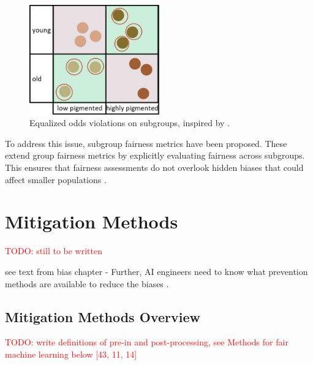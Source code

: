 \documentclass[12pt, a4paper, oneside]{book}   	%
\renewcommand{\todo}[1]{\textcolor{red}{TODO: #1}}
\begin{document}
		\begin{figure}[H]
			\centering
			\includegraphics[width=0.5\textwidth]{figures/EqualizedOddsSubgroupsIssueIllustration.png}
			\caption{Equalized odds violations on subgroups, inspired by \textcite{M80_Kearns_2019}.}
			\label{fig:eqOddsLimits}
		\end{figure}
		
		To address this issue, subgroup fairness metrics have been proposed. These extend group fairness metrics by explicitly evaluating fairness across subgroups. This ensures that fairness assessments do not overlook hidden biases that could affect smaller populations \autocite{M79_Kearns_2018,M80_Kearns_2019}.
		
			
		\section{Mitigation Methods}
			 \todo{still to be written}
			 
			 see text from bias chapter - Further, \gls{AI} engineers need to know what prevention methods are available to reduce the biases \autocite{Mehrabi_2021}.
			
			\subsection{Mitigation Methods Overview}
				\todo{write definitions of pre-in and post-processing, see Methods for fair machine learning below [43, 11, 14]}
\end{document}
